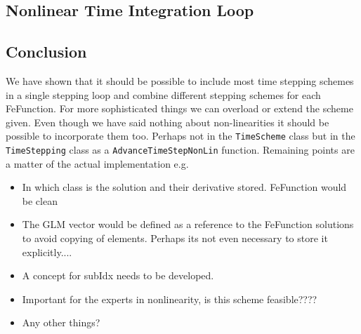 \subsection{Nonlinear Time Integration Loop}
\subsection{Conclusion}
We have shown that it should be possible to include most time stepping schemes in a single stepping
loop and combine different stepping schemes for each FeFunction. For more sophisticated things we can
overload or extend the scheme given. Even though we have said nothing about non-linearities it
should be possible to incorporate them too. Perhaps not in the \verb+TimeScheme+ class but in the
\verb+TimeStepping+ class as a \verb+AdvanceTimeStepNonLin+ function.
Remaining points are a matter of the actual implementation e.g.
\begin{itemize}
\item In which class is the solution and their derivative stored. FeFunction would be clean
\item The GLM vector would be defined as a reference to the FeFunction solutions to avoid copying
of elements. Perhaps its not even necessary to store it explicitly....
\item A concept for subIdx needs to be developed.
\item Important for the experts in nonlinearity, is this scheme feasible????
\item Any other things?
\end{itemize}
